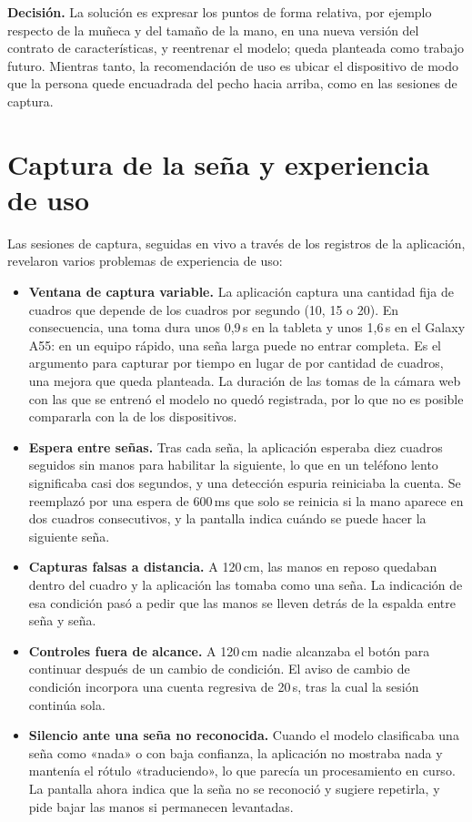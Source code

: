\textbf{Decisión.} La solución es expresar los puntos de forma relativa, por ejemplo respecto de la muñeca y del tamaño de la mano, en una nueva versión del contrato de características, y reentrenar el modelo; queda planteada como trabajo futuro. Mientras tanto, la recomendación de uso es ubicar el dispositivo de modo que la persona quede encuadrada del pecho hacia arriba, como en las sesiones de captura.

\section{Captura de la seña y experiencia de uso}

Las sesiones de captura, seguidas en vivo a través de los registros de la aplicación, revelaron varios problemas de experiencia de uso:

\begin{itemize}
    \item \textbf{Ventana de captura variable.} La aplicación captura una cantidad fija de cuadros que depende de los cuadros por segundo (10, 15 o 20). En consecuencia, una toma dura unos 0,9\,s en la tableta y unos 1,6\,s en el Galaxy A55: en un equipo rápido, una seña larga puede no entrar completa. Es el argumento para capturar por tiempo en lugar de por cantidad de cuadros, una mejora que queda planteada. La duración de las tomas de la cámara web con las que se entrenó el modelo no quedó registrada, por lo que no es posible compararla con la de los dispositivos.
    \item \textbf{Espera entre señas.} Tras cada seña, la aplicación esperaba diez cuadros seguidos sin manos para habilitar la siguiente, lo que en un teléfono lento significaba casi dos segundos, y una detección espuria reiniciaba la cuenta. Se reemplazó por una espera de 600\,ms que solo se reinicia si la mano aparece en dos cuadros consecutivos, y la pantalla indica cuándo se puede hacer la siguiente seña.
    \item \textbf{Capturas falsas a distancia.} A 120\,cm, las manos en reposo quedaban dentro del cuadro y la aplicación las tomaba como una seña. La indicación de esa condición pasó a pedir que las manos se lleven detrás de la espalda entre seña y seña.
    \item \textbf{Controles fuera de alcance.} A 120\,cm nadie alcanzaba el botón para continuar después de un cambio de condición. El aviso de cambio de condición incorpora una cuenta regresiva de 20\,s, tras la cual la sesión continúa sola.
    \item \textbf{Silencio ante una seña no reconocida.} Cuando el modelo clasificaba una seña como «nada» o con baja confianza, la aplicación no mostraba nada y mantenía el rótulo «traduciendo», lo que parecía un procesamiento en curso. La pantalla ahora indica que la seña no se reconoció y sugiere repetirla, y pide bajar las manos si permanecen levantadas.
\end{itemize}


